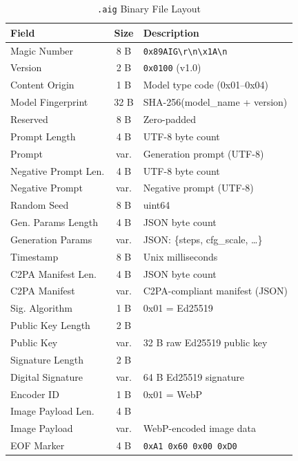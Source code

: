 \documentclass[conference]{IEEEtran}
\begin{document}
\begin{table}[ht]
\centering
\caption{\texttt{.aig} Binary File Layout}
\label{tab:aig_layout}
\begin{tabular}{|l|c|l|}
\hline
\textbf{Field} & \textbf{Size} & \textbf{Description} \\
\hline
Magic Number       & 8 B  & \texttt{0x89AIG\textbackslash r\textbackslash n\textbackslash x1A\textbackslash n} \\
Version            & 2 B  & \texttt{0x0100} (v1.0) \\
Content Origin     & 1 B  & Model type code (0x01–0x04) \\
Model Fingerprint  & 32 B & SHA-256(model\_name + version) \\
Reserved           & 8 B  & Zero-padded \\
Prompt Length      & 4 B  & UTF-8 byte count \\
Prompt             & var. & Generation prompt (UTF-8) \\
Negative Prompt Len. & 4 B & UTF-8 byte count \\
Negative Prompt    & var. & Negative prompt (UTF-8) \\
Random Seed        & 8 B  & uint64 \\
Gen. Params Length & 4 B  & JSON byte count \\
Generation Params  & var. & JSON: \{steps, cfg\_scale, \ldots\} \\
Timestamp          & 8 B  & Unix milliseconds \\
C2PA Manifest Len. & 4 B  & JSON byte count \\
C2PA Manifest      & var. & C2PA-compliant manifest (JSON) \\
Sig. Algorithm     & 1 B  & 0x01 = Ed25519 \\
Public Key Length  & 2 B  & \\
Public Key         & var. & 32 B raw Ed25519 public key \\
Signature Length   & 2 B  & \\
Digital Signature  & var. & 64 B Ed25519 signature \\
Encoder ID         & 1 B  & 0x01 = WebP \\
Image Payload Len. & 4 B  & \\
Image Payload      & var. & WebP-encoded image data \\
EOF Marker         & 4 B  & \texttt{0xA1 0x60 0x00 0xD0} \\
\hline
\end{tabular}
\end{table}
\end{document}
